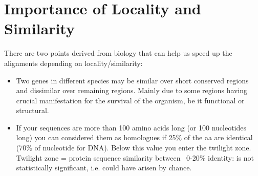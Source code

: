 \documentclass[12pt]{report}
\begin{document}
	\section{\textbf{Importance of Locality and Similarity}}
	There are two points derived from biology that can help us speed up the alignments depending on locality/similarity: \\
	\begin{itemize}
	\item Two genes in different species may be similar over short conserved regions and dissimilar over remaining regions. \cite{dgraur} Mainly due to some regions having crucial manifestation for the survival of the organism, be it functional or structural. \\
	\item If your sequences are more than 100 amino acids long (or 100 nucleotides long)
	you can considered them as homologues if 25\% of the aa are identical (70\% of
	nucleotide for DNA). Below this value you enter the twilight zone. \cite{Bordoli}\\
	Twilight zone = protein sequence similarity between  ~0-20\%  identity:
	is not statistically significant, i.e. could have arisen by chance.
	 \cite{Bordoli} \\
\end{itemize}

\newpage
\end{document}
